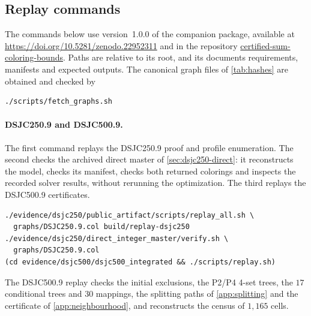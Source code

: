 \documentclass[11pt]{article}
\theoremstyle{definition}
\newcommand{\DSJCTwoFifty}{\textnormal{\textsc{DSJC250.9}}}
\newcommand{\DSJCFiveHundred}{\textnormal{\textsc{DSJC500.9}}}
\begin{document}
\subsection{Replay commands}
\label{app:replay}

The commands below use version~1.0.0 of the companion package,
available at \url{https://doi.org/10.5281/zenodo.22952311}
and in the repository
\href{https://github.com/SmileyEgrett/certified-sum-coloring-bounds}
{certified-sum-coloring-bounds}. Paths are
relative to its root, and its  documents requirements,
manifests and expected outputs. The canonical graph files of
\cref{tab:hashes} are obtained and checked by
\begin{lstlisting}[style=paperlisting]
./scripts/fetch_graphs.sh
\end{lstlisting}

\paragraph{\DSJCTwoFifty{} and \DSJCFiveHundred{}.} The first command replays
the \DSJCTwoFifty{} proof and profile enumeration. The second checks the
archived direct master of \cref{sec:dsjc250-direct}: it reconstructs the
model, checks its manifest, checks both returned colorings and inspects the
recorded solver results, without rerunning the optimization. The third
replays the \DSJCFiveHundred{} certificates.
\begin{lstlisting}[style=paperlisting]
./evidence/dsjc250/public_artifact/scripts/replay_all.sh \
  graphs/DSJC250.9.col build/replay-dsjc250
./evidence/dsjc250/direct_integer_master/verify.sh \
  graphs/DSJC250.9.col
(cd evidence/dsjc500/dsjc500_integrated && ./scripts/replay.sh)
\end{lstlisting}
The \DSJCFiveHundred{} replay checks the initial exclusions, the P2/P4 4-set
trees, the $17$ conditional trees and $30$ mappings, the splitting paths of
\cref{app:splitting} and the certificate of \cref{app:neighbourhood}, and
reconstructs the census of $1{,}165$ cells.
\end{document}
